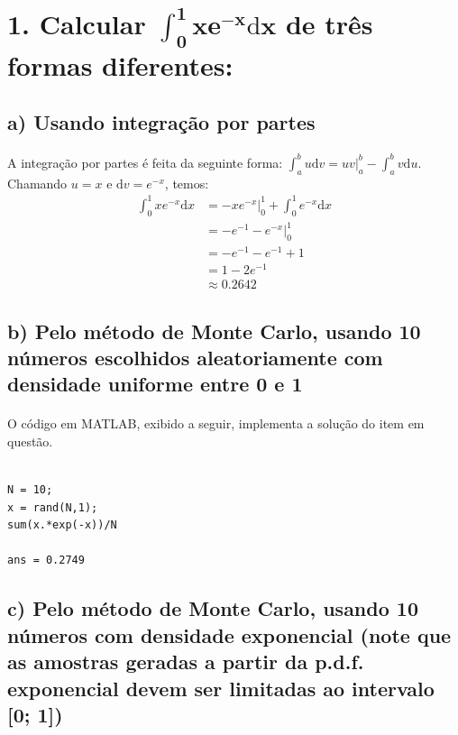 \documentclass{report}
\begin{document}


\section*{1. Calcular $\mathbf{\int_0^1 \! xe^{-x}\mathrm{d}x}$ de três formas diferentes:}

\subsection*{a) Usando integração por partes}

\paragraph{} A integração por partes é feita da seguinte forma: $\int_a^b \! u\mathrm{d}v = uv\big|_a^b - \int_a^b \! v\mathrm{d}u$. Chamando $u = x$ e $\mathrm{d}v = e^{-x}$, temos:\\

\begin{equation*}
\begin{split}
\int_0^1 \! xe^{-x}\mathrm{d}x & = - xe^{-x}\big|_0^1 + \int_0^1 \! e^{-x}\mathrm{d}x \\
& = - e^{-1} - e^{-x}\big|_0^1 \\
& = - e^{-1} - e^{-1} + 1 \\
& = 1 - 2e^{-1} \\
& \approx 0.2642
\end{split}
\end{equation*}

\subsection*{b) Pelo método de Monte Carlo, usando 10 números escolhidos aleatoriamente com densidade uniforme entre 0 e 1}

\paragraph{} O código em MATLAB, exibido a seguir, implementa a solução do item em questão.

\begin{verbatim}

N = 10; 
x = rand(N,1); 
sum(x.*exp(-x))/N

ans = 0.2749

\end{verbatim}

\subsection*{c) Pelo método de Monte Carlo, usando 10 números com densidade exponencial (note que as amostras geradas a partir da p.d.f. exponencial devem ser limitadas ao intervalo [0; 1])}
\end{document}
